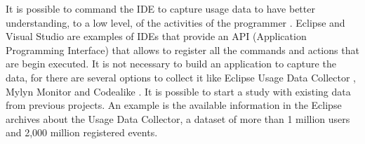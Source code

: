 It is possible to command the IDE to capture usage data to have better understanding, to a low level, of the activities of the programmer \cite{SnipesETALASD}. Eclipse and Visual Studio are examples of IDEs that provide an API (Application Programming Interface) that allows to register all the commands and actions that are begin executed. It is not necessary to build an application to capture the data, for there are several options to collect it like Eclipse Usage Data Collector \cite{MPB12}, Mylyn Monitor \cite{KM06} and Codealike \cite{CLQ15}. It is possible to start a study with existing data from previous projects. An example is the available information in the Eclipse archives about the Usage Data Collector, a dataset of more than 1 million users and 2,000 million registered events.




